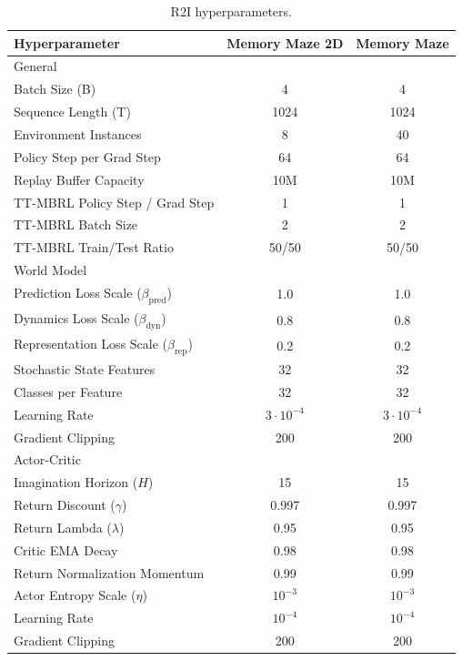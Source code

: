 \newpage

\begin{table}[!ht]
\caption{R2I hyperparameters.}
\setlength{\tabcolsep}{20pt}
\renewcommand{\arraystretch}{1.25}
\centering
\hfill \break
\begin{tabular}{lcc}
\toprule
Hyperparameter & Memory Maze 2D & Memory Maze \\ 
\midrule
General & \\
Batch Size (B) & 4 & 4 \\
Sequence Length (T) & 1024 & 1024 \\
Environment Instances & 8 & 40 \\
Policy Step per Grad Step & 64 & 64 \\
Replay Buffer Capacity & 10M & 10M \\
TT-MBRL Policy Step / Grad Step & 1 & 1 \\
TT-MBRL Batch Size & 2 & 2 \\
TT-MBRL Train/Test Ratio & 50/50 & 50/50 \\
\midrule
World Model & \\
Prediction Loss Scale ($\beta_{\text{pred}}$) & 1.0 & 1.0 \\
Dynamics Loss Scale ($\beta_{\text{dyn}}$) & 0.8 & 0.8 \\
Representation Loss Scale ($\beta_{\text{rep}}$) & 0.2 & 0.2 \\
Stochastic State Features & 32 & 32\\
Classes per Feature & 32 & 32\\
Learning Rate & $3 \cdot 10^{-4}$ & $3 \cdot 10^{-4}$\\
Gradient Clipping & 200 & 200 \\
\midrule
Actor-Critic & \\
Imagination Horizon ($H$) & 15 & 15\\
Return Discount ($\gamma$) & 0.997 & 0.997\\
Return Lambda ($\lambda$) & 0.95 & 0.95\\
Critic EMA Decay & 0.98 & 0.98 \\
Return Normalization Momentum & 0.99 & 0.99 \\
Actor Entropy Scale ($\eta$) & $10^{-3}$ & $10^{-3}$\\
Learning Rate & $10^{-4}$ & $10^{-4}$\\
Gradient Clipping & 200 & 200 \\
\bottomrule
\end{tabular}
\label{table:hyperparams_r2i}
\end{table}

